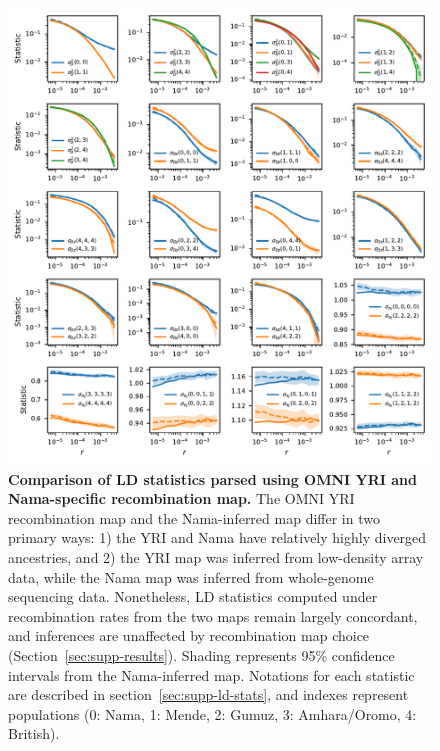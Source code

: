 \documentclass[]{article}
\begin{document}
\begin{figure}[ht]
    \centering
    \includegraphics{figures/supp-omni-nama-comparison.pdf}
    \caption{
        \textbf{Comparison of LD statistics parsed using OMNI YRI and
        Nama-specific recombination map.}
        The OMNI YRI recombination map and the Nama-inferred map
        \citep{Van_Eeden2021-od} differ in two primary ways: 1) the YRI and
        Nama have relatively highly diverged ancestries, and 2) the YRI
        map was inferred from low-density array data, while the Nama map
        was inferred from whole-genome sequencing data.
        Nonetheless, LD statistics computed under recombination rates from
        the two maps remain largely concordant, and inferences are
        unaffected by recombination map choice (Section~\ref{sec:supp-results}).
        Shading represents 95\% confidence intervals from the Nama-inferred
        map. Notations for each statistic are described in
        section~\ref{sec:supp-ld-stats}, and indexes represent populations
        (0: Nama, 1: Mende, 2: Gumuz, 3: Amhara/Oromo, 4: British).
    }
    \label{fig:supp-omni-nama-comparison}
\end{figure}
\end{document}
